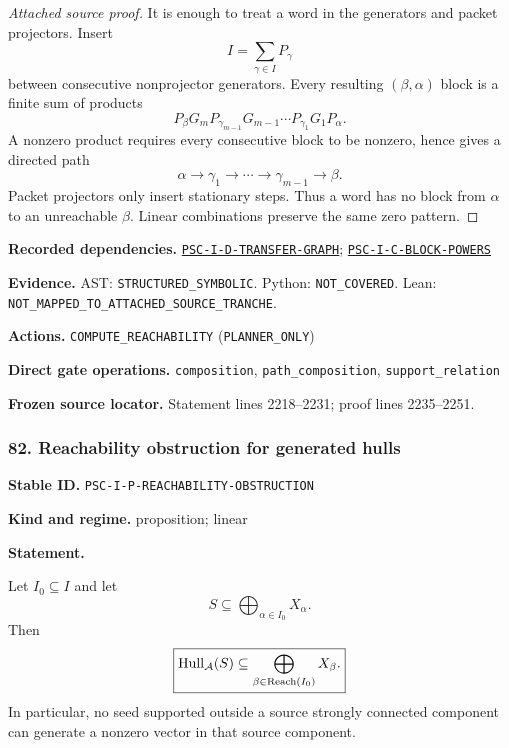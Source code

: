\documentclass[a4paper,11pt]{article}
\newcommand{\Hull}{\operatorname{Hull}}\newcommand{\srank}{\operatorname{srank}}\newcommand{\psrank}{\operatorname{psrank}}\newcommand{\End}{\operatorname{End}}\newcommand{\Hom}{\operatorname{Hom}}\newcommand{\im}{\operatorname{im}}\newcommand{\Ker}{\operatorname{Ker}}\newcommand{\Jac}{\operatorname{Jac}}\newcommand{\Irr}{\operatorname{Irr}}\newcommand{\Span}{\operatorname{span}}\newcommand{\alg}{\operatorname{alg}}\newcommand{\Reach}{\operatorname{Reach}}\newcommand{\Supp}{\operatorname{Supp}}\newcommand{\id}{\mathrm{id}}\newcommand{\cl}[1]{\overline{#1}}
\newcommand{\field}[2]{\noindent\textbf{#1.} #2\par}
\begin{document}
\begin{proof}[Attached source proof]
It is enough to treat a word in the generators and packet projectors.  Insert
\[
I=\sum_{\gamma\in I}P_\gamma
\]
between consecutive nonprojector generators.  Every resulting $(\beta,\alpha)$ block is a finite sum of products
\[
P_\beta G_mP_{\gamma_{m-1}}
G_{m-1}\cdots
P_{\gamma_1}G_1P_\alpha.
\]
A nonzero product requires every consecutive block to be nonzero, hence gives a directed path
\[
\alpha\to\gamma_1\to\cdots\to\gamma_{m-1}\to\beta.
\]
Packet projectors only insert stationary steps.  Thus a word has no block from $\alpha$ to an unreachable $\beta$.  Linear combinations preserve the same zero pattern.
\end{proof}
\field{Recorded dependencies}{\hyperref[rec:PSC-I-D-TRANSFER-GRAPH]{\nolinkurl{PSC-I-D-TRANSFER-GRAPH}}; \hyperref[rec:PSC-I-C-BLOCK-POWERS]{\nolinkurl{PSC-I-C-BLOCK-POWERS}}}
\field{Evidence}{AST: \nolinkurl{STRUCTURED_SYMBOLIC}. Python: \nolinkurl{NOT_COVERED}. Lean: \nolinkurl{NOT_MAPPED_TO_ATTACHED_SOURCE_TRANCHE}.}
\field{Actions}{\nolinkurl{COMPUTE_REACHABILITY} (\nolinkurl{PLANNER_ONLY})}
\field{Direct gate operations}{\nolinkurl{composition}, \nolinkurl{path_composition}, \nolinkurl{support_relation}}
\field{Frozen source locator}{Statement lines 2218--2231; proof lines 2235--2251.}
\subsubsection*{82. Reachability obstruction for generated hulls}
\label{rec:PSC-I-P-REACHABILITY-OBSTRUCTION}
\field{Stable ID}{\nolinkurl{PSC-I-P-REACHABILITY-OBSTRUCTION}}
\field{Kind and regime}{proposition; linear}
\textbf{Statement.}\par
Let $I_0\subseteq I$ and let
\[
S\subseteq\bigoplus_{\alpha\in I_0}X_\alpha.
\]
Then
\[
\boxed{
\Hull_{\A}(S)
\subseteq
\bigoplus_{\beta\in\Reach(I_0)}X_\beta.
}
\]
In particular, no seed supported outside a source strongly connected component can generate a nonzero vector in that source component.
\end{document}
